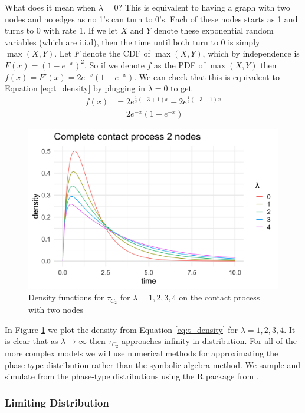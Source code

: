 What does it mean when $\lambda = 0$? This is equivalent to having a graph with two nodes and no edges as no 1's can turn to 0's.
Each of these nodes starts as 1 and turns to 0 with rate 1.
If we let $X$ and $Y$ denote these exponential random variables (which are i.i.d), then  the time until both turn to 0 is simply $\max(X,Y)$.
Let $F$ denote the CDF of $\max(X,Y)$, which by independence is $F(x) = (1 - e^{-x})^2$.
So if we denote $f$ as the PDF of $\max(X,Y)$ then $f(x) = F'(x) = 2e^{-x}(1 - e^{-x})$.
We can check that this is equivalent to Equation \eqref{eq:t_density} by plugging in $\lambda = 0$ to get
\begin{align*}
f(x) &= 2 e^{\frac{1}{2}(-3 + 1)x} - 2e^{\frac{1}{2}(-3 - 1)x}\\
&= 2 e^{-x}(1 - e^{-x})
\end{align*}


\begin{figure}[H]
  \centering
    \includegraphics[width=.80\textwidth]{figures/complete_2_contact_phase_densities.png}
   \caption{Density functions for $\tau_{C_2}$ for $\lambda = 1, 2, 3, 4$ on the contact process with two nodes}
  \label{fig:contact_2_phase_densities}
\end{figure}

In Figure \ref{fig:contact_2_phase_densities} we plot the density from Equation \ref{eq:t_density} for $\lambda = 1, 2, 3, 4$.
It is clear that as $\lambda \to \infty$ then $\tau_{C_2}$ approaches infinity in distribution.
For all of the more complex models we will use numerical methods for approximating the phase-type distribution rather than the symbolic algebra method.
We sample and simulate from the phase-type distributions using the R package from \cite{actuar2008}.

\subsubsection{Limiting Distribution}


